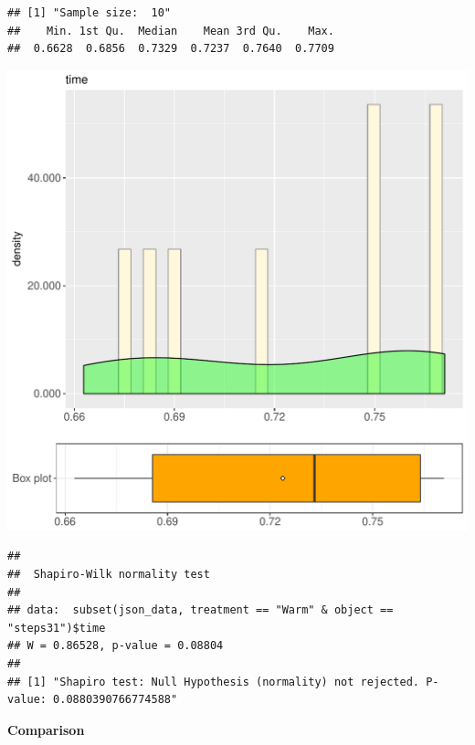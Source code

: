 \documentclass{article}\usepackage[]{graphicx}\usepackage[]{color}
\makeatletter
\def\maxwidth{ %
  \ifdim\Gin@nat@width>\linewidth
    \linewidth
  \else
    \Gin@nat@width
  \fi
}
\newenvironment{kframe}{%
 \def\at@end@of@kframe{}%
 \ifinner\ifhmode%
  \def\at@end@of@kframe{\end{minipage}}%
  \begin{minipage}{\columnwidth}%
 \fi\fi%
 \def\FrameCommand##1{\hskip\@totalleftmargin \hskip-\fboxsep
 \colorbox{shadecolor}{##1}\hskip-\fboxsep
     \hskip-\linewidth \hskip-\@totalleftmargin \hskip\columnwidth}%
 \MakeFramed {\advance\hsize-\width
   \@totalleftmargin\z@ \linewidth\hsize
   \@setminipage}}%
 {\par\unskip\endMakeFramed%
 \at@end@of@kframe}
\newenvironment{knitrout}{}{} %
\makeatother
\begin{document}
\begin{knitrout}
\color{fgcolor}\begin{kframe}
\begin{verbatim}
## [1] "Sample size:  10"
##    Min. 1st Qu.  Median    Mean 3rd Qu.    Max. 
##  0.6628  0.6856  0.7329  0.7237  0.7640  0.7709
\end{verbatim}
\end{kframe}
\includegraphics[width=\maxwidth]{figure/RH1_Warm_steps31-1} 
\begin{kframe}\begin{verbatim}
## 
## 	Shapiro-Wilk normality test
## 
## data:  subset(json_data, treatment == "Warm" & object == "steps31")$time
## W = 0.86528, p-value = 0.08804
## 
## [1] "Shapiro test: Null Hypothesis (normality) not rejected. P-value: 0.0880390766774588"
\end{verbatim}
\end{kframe}
\end{knitrout}
  
 \textbf{Comparison}
  
\end{document}
